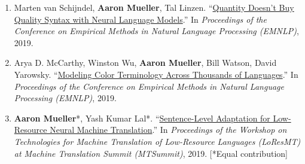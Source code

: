 \documentclass[10pt]{article}
\newcommand{\halfblankline}{\quad\vspace{-0.5\baselineskip}\pagebreak[3]}
\providecommand*\titlelink[2]{\href{#1}{\textcolor{accent}{#2}}}
\begin{document}
\begin{enumerate}[leftmargin=*, topsep=0pt, itemsep=0.25ex, partopsep=0ex, parsep=1ex]
	\item Marten van Schijndel, \textbf{Aaron Mueller}, Tal Linzen. ``\titlelink{https://aclanthology.org/D19-1592/}{Quantity Doesn't Buy Quality Syntax with Neural Language Models}.'' In \emph{Proceedings of the Conference on Empirical Methods in Natural Language Processing (EMNLP)}, 2019.

	\item Arya D. McCarthy, Winston Wu, \textbf{Aaron Mueller}, Bill Watson, David Yarowsky. ``\titlelink{https://aclanthology.org/D19-1229/}{Modeling Color Terminology Across Thousands of Languages}.'' In \emph{Proceedings of the Conference on Empirical Methods in Natural Language Processing (EMNLP)}, 2019.

	\item \textbf{Aaron Mueller}*, Yash Kumar Lal*. ``\titlelink{https://aclanthology.org/W19-6807/}{Sentence-Level Adaptation for Low-Resource Neural Machine Translation}.'' In \emph{Proceedings of the Workshop on Technologies for Machine Translation of Low-Resource Languages (LoResMT) at Machine Translation Summit (MTSummit)}, 2019. [*Equal contribution]\label{pub:sent-level}
	\end{enumerate}



	\halfblankline
\end{document}

